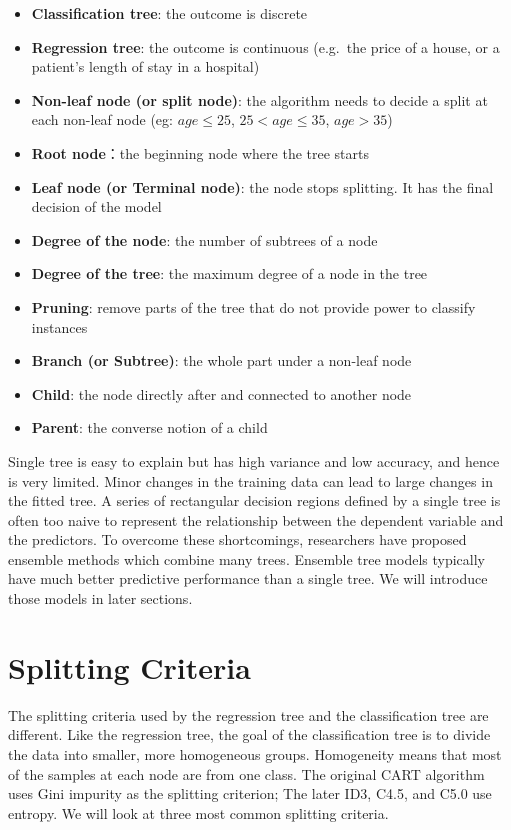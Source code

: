 \documentclass[12pt,]{krantz}
\providecommand{\tightlist}{%
  \setlength{\itemsep}{0pt}\setlength{\parskip}{0pt}}
\begin{document}
\begin{itemize}
\tightlist
\item
  \textbf{Classification tree}: the outcome is discrete
\item
  \textbf{Regression tree}: the outcome is continuous (e.g.~the price of a house, or a patient's length of stay in a hospital)
\item
  \textbf{Non-leaf node (or split node)}: the algorithm needs to decide a split at each non-leaf node (eg: \(age \leq 25\), \(25 < age \leq 35\), \(age > 35\))
\item
  \textbf{Root node}：the beginning node where the tree starts
\item
  \textbf{Leaf node (or Terminal node)}: the node stops splitting. It has the final decision of the model
\item
  \textbf{Degree of the node}: the number of subtrees of a node
\item
  \textbf{Degree of the tree}: the maximum degree of a node in the tree
\item
  \textbf{Pruning}: remove parts of the tree that do not provide power to classify instances
\item
  \textbf{Branch (or Subtree)}: the whole part under a non-leaf node
\item
  \textbf{Child}: the node directly after and connected to another node
\item
  \textbf{Parent}: the converse notion of a child
\end{itemize}

Single tree is easy to explain but has high variance and low accuracy, and hence is very limited. Minor changes in the training data can lead to large changes in the fitted tree. A series of rectangular decision regions defined by a single tree is often too naive to represent the relationship between the dependent variable and the predictors. To overcome these shortcomings, researchers have proposed ensemble methods which combine many trees. Ensemble tree models typically have much better predictive performance than a single tree. We will introduce those models in later sections.

\hypertarget{splitting-criteria}{%
\section{Splitting Criteria}\label{splitting-criteria}}

The splitting criteria used by the regression tree and the classification tree are different. Like the regression tree, the goal of the classification tree is to divide the data into smaller, more homogeneous groups. Homogeneity means that most of the samples at each node are from one class. The original CART algorithm uses Gini impurity as the splitting criterion; The later ID3, C4.5, and C5.0 use entropy. We will look at three most common splitting criteria.
\end{document}
